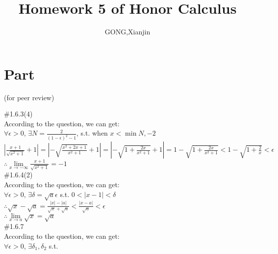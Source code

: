 \documentclass{article}
\author{GONG,Xianjin}
\title{Homework 5 of Honor Calculus}
\begin{document}
\maketitle

\section{\textcolor[rgb]{0.70,0.00,0.00}{Part \uppercase\expandafter{}}}(for peer review)

\vspace{3.5mm}

\textcolor[rgb]{0.00,0.00,0.50}{\#1.6.3(4)}\\

According to the question, we can get:\\

$\forall\epsilon>0$, $\exists N=\displaystyle\frac{2}{(1-\epsilon)^2-1}$, s.t. when $x<\min{N, -2}$\\

$\displaystyle\left|\frac{x+1}{\sqrt{x^2+1}}+1\right|=\left|-\sqrt{\frac{x^2+2x+1}{x^2+1}}+1\right|=\left|-\sqrt{1+\frac{2x}{x^2+1}}+1\right|=1-\sqrt{1+\frac{2x}{x^2+1}}<1-\sqrt{1+\frac{2}{x}}<\epsilon$\\

$\therefore$\qquad$\displaystyle\lim \limits_{x \to -\infty}\frac{x+1}{\sqrt{x^2+1}}=-1$\\

\textcolor[rgb]{0.00,0.00,0.50}{\#1.6.4(2)}\\

According to the question, we can get:\\

$\forall\epsilon>0$, $\exists\delta=\sqrt{a}\epsilon$ s.t. $0<|x-1|<\delta$\\

$\therefore$\qquad$\sqrt{x}-\sqrt{a}=\displaystyle\frac{|x|-|a|}{\sqrt{x}+\sqrt{a}}<\frac{|x-a|}{\sqrt{a}}<\epsilon$\\

$\therefore$\qquad$\lim \limits_{x \to a}\sqrt{x}=\sqrt{a}$\\

\textcolor[rgb]{0.00,0.00,0.50}{\#1.6.7}\\

According to the question, we can get:\\

$\forall\epsilon>0$, $\exists\delta_1,\delta_2$ s.t.\\
\end{document}
